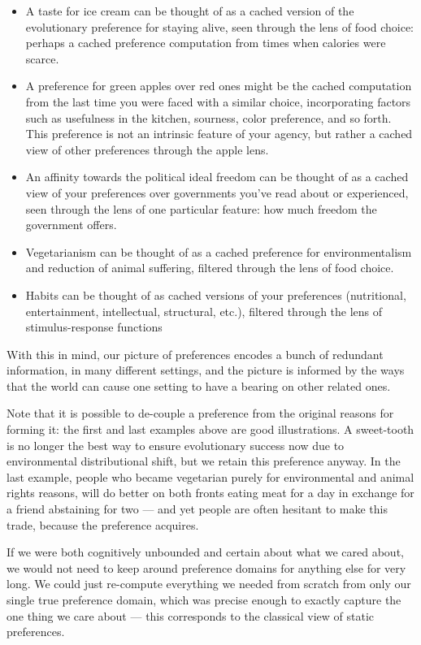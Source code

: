 \documentclass{article}
\begin{document}
	\begin{itemize}[nosep]
		\item A taste for ice cream can be thought of as a cached version of the evolutionary preference for staying alive, seen through the lens of food choice: perhaps a cached preference computation from times when calories were scarce.
		\item A preference for green apples over red ones might be the cached computation from the last time you were faced with a similar choice, incorporating factors such as usefulness in the kitchen, sourness, color preference, and so forth. This preference is not an intrinsic feature of your agency, but rather a cached view of other preferences through the apple lens.
		\item An affinity towards the political ideal freedom can be thought of as a cached view of your preferences over governments you've read about or experienced, seen through the lens of one particular feature: how much freedom the government offers.
		\item Vegetarianism can be thought of as a cached preference for environmentalism and reduction of animal suffering, filtered through the lens of food choice.
		\item Habits can be thought of as cached versions of your preferences (nutritional, entertainment, intellectual, structural, etc.), filtered through the lens of stimulus-response functions
	\end{itemize}
	
	With this in mind, our picture of preferences encodes a bunch of redundant information, in many different settings, and the picture is informed by the ways that the world can cause one setting to have a bearing on other related ones. 
	
	Note that it is possible to de-couple a preference from the original reasons for forming it: the first and last examples above are good illustrations. A sweet-tooth is no longer the best way to ensure evolutionary success now due to environmental distributional shift, but we retain this preference anyway. In the last example, people who became vegetarian purely for environmental and animal rights reasons, will do better on both fronts eating meat for a day in exchange for a friend abstaining for two --- and yet people are often hesitant to make this trade, because the preference acquires.
	
	If we were both cognitively unbounded and certain about what we cared about, we would not need to keep around preference domains for anything else for very long. We could just re-compute everything we needed from scratch from only our single true preference domain, which was precise enough to exactly capture the one thing we care about --- this corresponds to the classical view of static preferences.
	
\end{document}
